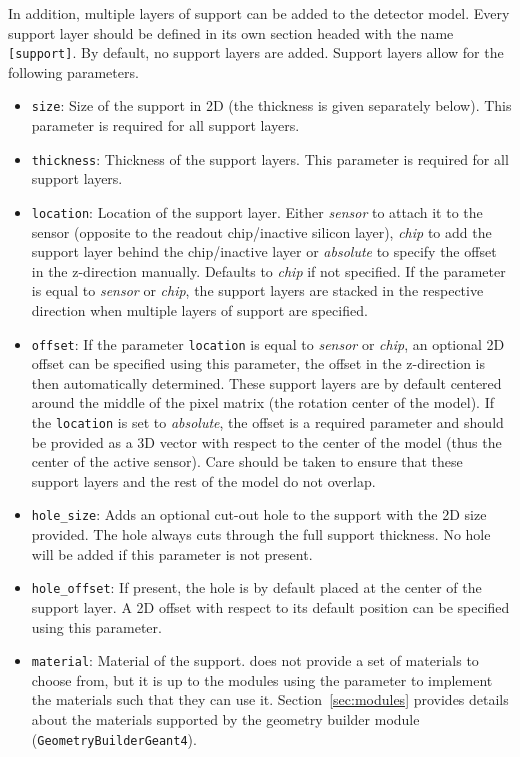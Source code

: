 In addition, multiple layers of support can be added to the detector model.
Every support layer should be defined in its own section headed with the name \texttt{[support]}.
By default, no support layers are added.
Support layers allow for the following parameters.
\begin{itemize}
\item \texttt{size}: Size of the support in 2D (the thickness is given separately below).
This parameter is required for all support layers.
\item \texttt{thickness}: Thickness of the support layers.
This parameter is required for all support layers.
\item \texttt{location}: Location of the support layer.
Either \textit{sensor} to attach it to the sensor (opposite to the readout chip/inactive silicon layer), \textit{chip} to add the support layer behind the chip/inactive layer or \textit{absolute} to specify the offset in the z-direction manually.
Defaults to \textit{chip} if not specified.
If the parameter is equal to \textit{sensor} or \textit{chip}, the support layers are stacked in the respective direction when multiple layers of support are specified.
\item \texttt{offset}: If the parameter \texttt{location} is equal to \textit{sensor} or \textit{chip}, an optional 2D offset can be specified using this parameter, the offset in the z-direction is then automatically determined.
These support layers are by default centered around the middle of the pixel matrix (the rotation center of the model).
If the \texttt{location} is set to \textit{absolute}, the offset is a required parameter and should be provided as a 3D vector with respect to the center of the model (thus the center of the active sensor).
Care should be taken to ensure that these support layers and the rest of the model do not overlap.
\item \texttt{hole\_size}: Adds an optional cut-out hole to the support with the 2D size provided.
The hole always cuts through the full support thickness.
No hole will be added if this parameter is not present.
\item \texttt{hole\_offset}: If present, the hole is by default placed at the center of the support layer.
A 2D offset with respect to its default position can be specified using this parameter.
\item \texttt{material}: Material of the support. \apsq does not provide a set of materials to choose from, but it is up to the modules using the parameter to implement the materials such that they can use it.
Section~\ref{sec:modules} provides details about the materials supported by the geometry builder module (\texttt{GeometryBuilderGeant4}).
\end{itemize}

